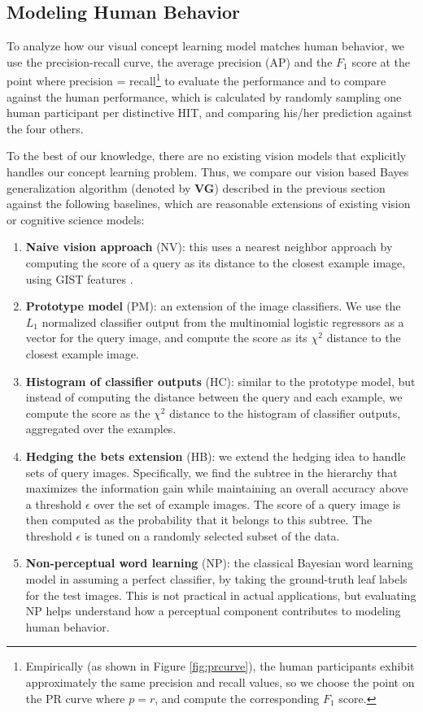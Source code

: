 \subsection{Modeling Human Behavior}
To analyze how our visual concept learning model matches human behavior, we use the precision-recall curve, the average precision (AP) and the $F_1$ score at the point where precision = recall\footnote{Empirically (as shown in Figure \ref{fig:prcurve}), the human participants exhibit approximately the same precision and recall values, so we choose the point on the PR curve where $p = r$, and compute the corresponding $F_1$ score.}
to evaluate the performance and to compare against the human performance, which is calculated by randomly sampling one human participant per distinctive HIT, and comparing his/her prediction against the four others.

To the best of our knowledge, there are no existing vision models that explicitly handles our concept learning problem. Thus, we compare our vision based Bayes generalization algorithm (denoted by {\bfseries VG}) described in the previous section against the following baselines, which are reasonable extensions of existing vision or cognitive science models:
\begin{enumerate}\setlength{\itemsep}{0pt}\setlength{\parskip}{0pt}
    \item {\bfseries Naive vision approach} (NV): this uses a nearest neighbor approach by computing the score of a query as its distance to the closest example image, using GIST features \cite{oliva2001modeling}.
    \item {\bfseries Prototype model} (PM): an extension of the image classifiers. We use the $L_1$ normalized classifier output from the multinomial logistic regressors as a vector for the query image, and compute the score as its $\chi^2$ distance to the closest example image.
    \item {\bfseries Histogram of classifier outputs} (HC): similar to the prototype model, but instead of computing the distance between the query and each example, we compute the score as the $\chi^2$ distance to the histogram of classifier outputs, aggregated over the examples.
    \item {\bfseries Hedging the bets extension} (HB): we extend the hedging idea \cite{deng2012hedging} to handle sets of query images. Specifically, we find the subtree in the hierarchy that maximizes the information gain while maintaining an overall accuracy above a threshold $\epsilon$ over the set of example images. The score of a query image is then computed as the probability that it belongs to this subtree. The threshold $\epsilon$ is tuned on a randomly selected subset of the data.
    \item {\bfseries Non-perceptual word learning} (NP): the classical Bayesian word learning model in \cite{xu2007word} assuming a perfect classifier, \ie by taking the ground-truth leaf labels for the test images. This is not practical in actual applications, but evaluating NP helps understand how a perceptual component contributes to modeling human behavior.
\end{enumerate}

